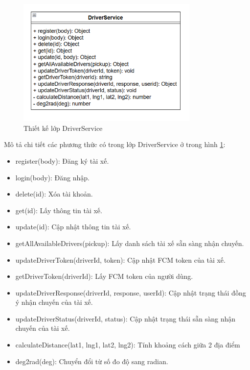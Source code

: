 \documentclass[../DoAn.tex]{subfiles}
\begin{document}
\begin{figure}[H]
    \centering
    \includegraphics[width=0.8\textwidth]{Hinhve/Lop_driver_service.png}
    \caption{Thiết kế lớp DriverService}
    \label{fig:Lop_driver_service}
\end{figure}
Mô tả chi tiết các phương thức có trong lớp DriverService ở trong hình \ref{fig:Lop_driver_service}:
\begin{itemize}
    \item register(body): Đăng ký tài xế.
    \item login(body): Đăng nhập.
    \item delete(id): Xóa tài khoản.
    \item get(id): Lấy thông tin tài xế.
    \item update(id): Cập nhật thông tin tài xế.
    \item getAllAvailableDrivers(pickup): Lấy danh sách tài xế sẵn sàng nhận chuyến.
    \item updateDriverToken(driverId, token): Cập nhật FCM token của tài xế.
    \item getDriverToken(driverId): Lấy FCM token của người dùng.
    \item updateDriverResponse(driverId, response, userId): Cập nhật trạng thái đồng ý nhận chuyến của tài xế.
    \item updateDriverStatus(driverId, status): Cập nhật trạng thái sẵn sàng nhận chuyến của tài xế.
    \item calculateDistance(lat1, lng1, lat2, lng2): Tính khoảng cách giữa 2 địa điểm
    \item deg2rad(deg): Chuyển đổi từ số đo độ sang radian.
\end{itemize}
\end{document}
